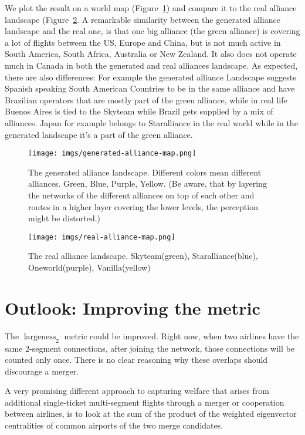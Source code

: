 \documentclass[twocolumn]{tum-article}
\DeclareMathOperator{\Largeness}{largeness}
\begin{document}
We plot the result on a world map (Figure~\ref{fig:generated-alliance-map}) and compare it to the real alliance landscape (Figure~\ref{fig:real-alliance-map}. A remarkable similarity between the generated alliance landscape and the real one, is that one big alliance (the green alliance) is covering a lot of flights between the US, Europe and China, but is not much active in South America, South Africa, Australia or New Zealand. It also does not operate much in Canada in both the generated and real alliances landscape. 
As expected, there are also differences: For example the generated alliance Landscape suggests Spanish speaking South American Countries to be in the same alliance and have Brazilian operators that are mostly part of the green alliance, while in real life Buenos Aires is tied to the Skyteam while Brazil gets supplied by a mix of alliances. Japan for example belongs to Staralliance in the real world while in the generated landscape it's a part of the green alliance. 

\begin{figure}[t]
	\centering
	\texttt{[image: imgs/generated-alliance-map.png]}
	\caption{
The generated alliance landscape. Different colors mean different alliances. Green, Blue, Purple, Yellow. (Be aware, that by layering the networks of the different alliances on top of each other and routes in a higher layer covering the lower levels, the perception might be distorted.)}
	\label{fig:generated-alliance-map}
\end{figure}

\begin{figure}[t]
	\centering
	\texttt{[image: imgs/real-alliance-map.png]}
	\caption{
The real alliance landscape. Skyteam(green), Staralliance(blue), Oneworld(purple), Vanilla(yellow)}
	\label{fig:real-alliance-map}
\end{figure}

\section{Outlook: Improving the metric}
The $\Largeness_{2}$ metric could be improved. Right now, when two airlines have the same 2-segment connections, after joining the network, those connections will be counted only once. There is no clear reasoning why these overlaps should discourage a merger. 

A very promising different approach to capturing welfare that arises from additional single-ticket multi-segment flights through a merger or cooperation between airlines, is to look at the sum of the product of the weighted eigenvector centralities of common airports of the two merge candidates. 
\end{document}
